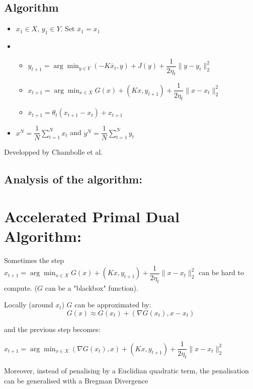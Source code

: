 \documentclass[10pt]{article}
\begin{document}
\subsection{Algorithm}

\begin{itemize}
\item $x_{1} \in X$, $y_{1} \in Y$. Set $\overline{x}_{1} = x_{1}$
\item

\begin{itemize}
\item $y_{t+1} = \arg\min_{y \in Y} (-K\overline{x}_{t},y) + J(y) + \dfrac{1}{2\eta_{t}} \lVert y - y_{t} \rVert_{2}^{2}$
\item $x_{t+1} = \arg\min_{x \in X} G(x) + (Kx,y_{t+1}) + \dfrac{1}{2\eta_{t}}\lVert x - x_{t} \rVert_{2}^{2} $
\item $\overline{x}_{t+1} = \theta_{t}(x_{t+1} - x_{t}) + x_{t+1}$
\end{itemize}

\item $x^{N} = \dfrac{1}{N}\sum_{t=1}^{N} x_{t}$ and $y^{N} = \dfrac{1}{N}\sum_{t=1}^{N} y_{t}$
\end{itemize}

Developped by Chambolle et al.

\subsection{ Analysis of the algorithm: }


\section{ Accelerated Primal Dual Algorithm: }


Sometimes the step $x_{t+1} = \arg\min_{x \in X} G(x) + (Kx,y_{t+1}) + \dfrac{1}{2\eta_{t}}\lVert x - x_{t} \rVert_{2}^{2}$ can be hard to compute.
($G$ can be a "blackbox" function).

Locally (around $x_{t}$) $G$ can be approximated by:
$$
G(x) \approx G(x_{t}) + (\nabla G(x_{t}),x - x_{t})
$$

and the previous step becomes:

$x_{t+1} = \arg\min_{x \in X} (\nabla G(x_{t}),x) + (Kx,y_{t+1}) + \dfrac{1}{2\eta_{t}}\lVert x - x_{t} \rVert_{2}^{2}$

Moreover, instead of penalising by a Euclidian quadratic term, the penalisation can be generalised with a Bregman Divergence
\end{document}
